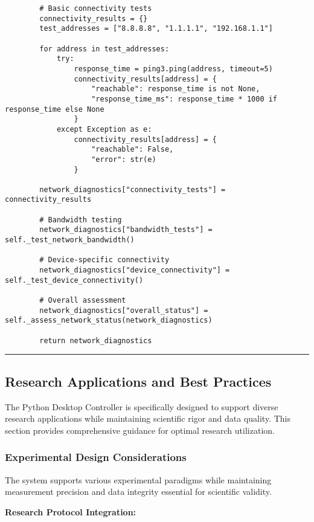 \documentclass[12pt,a4paper]{article}
\begin{document}
\begin{verbatim}
        # Basic connectivity tests
        connectivity_results = {}
        test_addresses = ["8.8.8.8", "1.1.1.1", "192.168.1.1"]

        for address in test_addresses:
            try:
                response_time = ping3.ping(address, timeout=5)
                connectivity_results[address] = {
                    "reachable": response_time is not None,
                    "response_time_ms": response_time * 1000 if response_time else None
                }
            except Exception as e:
                connectivity_results[address] = {
                    "reachable": False,
                    "error": str(e)
                }

        network_diagnostics["connectivity_tests"] = connectivity_results

        # Bandwidth testing
        network_diagnostics["bandwidth_tests"] = self._test_network_bandwidth()

        # Device-specific connectivity
        network_diagnostics["device_connectivity"] = self._test_device_connectivity()

        # Overall assessment
        network_diagnostics["overall_status"] = self._assess_network_status(network_diagnostics)

        return network_diagnostics
\end{verbatim}

\hrule

\subsection{Research Applications and Best Practices}

The Python Desktop Controller is specifically designed to support diverse research applications while maintaining
scientific rigor and data quality. This section provides comprehensive guidance for optimal research utilization.

\subsubsection{Experimental Design Considerations}

The system supports various experimental paradigms while maintaining measurement precision and data integrity essential
for scientific validity.

\textbf{Research Protocol Integration:}
\end{document}
